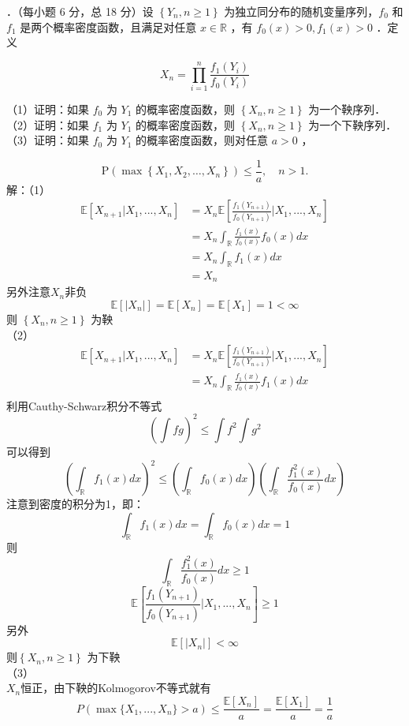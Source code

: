 \documentclass[UTF8]{ctexart}
\begin{document}
．（每小题 6 分，总 18 分）设 $\left\{Y_{n}, n \geq 1\right\}$ 为独立同分布的随机变量序列，$f_{0}$ 和 $f_{1}$ 是两个概率密度函数，且满足对任意 $x \in \mathbb{R}$ ，有 $f_{0}(x)>0, f_{1}(x)>0$ ．定义

$$
X_{n}=\prod_{i=1}^{n} \frac{f_{1}\left(Y_{i}\right)}{f_{0}\left(Y_{i}\right)}
$$

\noindent （1）证明：如果 $f_{0}$ 为 $Y_{1}$ 的概率密度函数，则 $\left\{X_{n}, n \geq 1\right\}$ 为一个鞅序列．\\
（2）证明：如果 $f_{1}$ 为 $Y_{1}$ 的概率密度函数，则 $\left\{X_{n}, n \geq 1\right\}$ 为一个下鞅序列．\\
（3）证明：如果 $f_{0}$ 为 $Y_{1}$ 的概率密度函数，则对任意 $a>0$ ，

$$
\mathrm{P}\left(\max \left\{X_{1}, X_{2}, \ldots, X_{n}\right\} \right) \leq \frac{1}{a}, \quad n>1 .
$$
解：（1）\\
$$
\begin{aligned}
	\mathbb{E}[X_{n+1}|X_1,...,X_n]&=X_n\mathbb{E}\left[ \frac{f_1(Y_{n+1})}{f_0(Y_{n+1})}|X_1,...,X_n\right] \\
	&=X_n \int_{\mathbb{R}} \frac{f_1(x)}{f_0(x)} f_0(x) dx\\
	&=X_n \int_{\mathbb{R}}f_1(x) dx\\
	&=X_n
\end{aligned}
$$
另外注意$X_n$非负
\[
\mathbb{E}[|X_n|]=\mathbb{E}[X_n]=\mathbb{E}[X_1]=1<\infty
\]
则 $\left\{X_{n}, n \geq 1\right\}$ 为鞅\\
（2）\\
$$
\begin{aligned}
\mathbb{E}[X_{n+1}|X_1,...,X_n]&=X_n\mathbb{E}\left[ \frac{f_1(Y_{n+1})}{f_0(Y_{n+1})}|X_1,...,X_n\right] \\
	&=X_n \int_{\mathbb{R}} \frac{f_1(x)}{f_0(x)} f_1(x) dx\\
\end{aligned}
$$
利用Cauthy-Schwarz积分不等式
\[
\left(\int fg \right)^2 \le \int f^2 \int g^2 
\]
可以得到
\[
\left(\int_{\mathbb{R}} f_1(x)dx \right)^2 \le \left(\int_{\mathbb{R}} f_0(x)dx \right)\left(\int_{\mathbb{R}} \frac{f_1^2(x)}{f_0(x)}dx \right)   
\]
注意到密度的积分为1，即：
$$\int_{\mathbb{R}} f_1(x)dx=\int_{\mathbb{R}} f_0(x)dx=1$$
则
\[
\int_{\mathbb{R}} \frac{f_1^2(x)}{f_0(x)}dx \ge 1
\]
\[
\mathbb{E}\left[ \frac{f_1(Y_{n+1})}{f_0(Y_{n+1})}|X_1,...,X_n\right] \ge 1
\]
另外
\[
\mathbb{E}[|X_n|]<\infty
\]
则$\left\{X_{n}, n \geq 1\right\}$ 为下鞅\\
（3）\\
$X_n$恒正，由下鞅的Kolmogorov不等式就有\\
\[
P(\max\{X_1,...,X_n\}>a) \le \frac{\mathbb{E}[X_n]}{a}=\frac{\mathbb{E}[X_1]}{a}=\frac{1}{a}
\]\\
\end{document}
